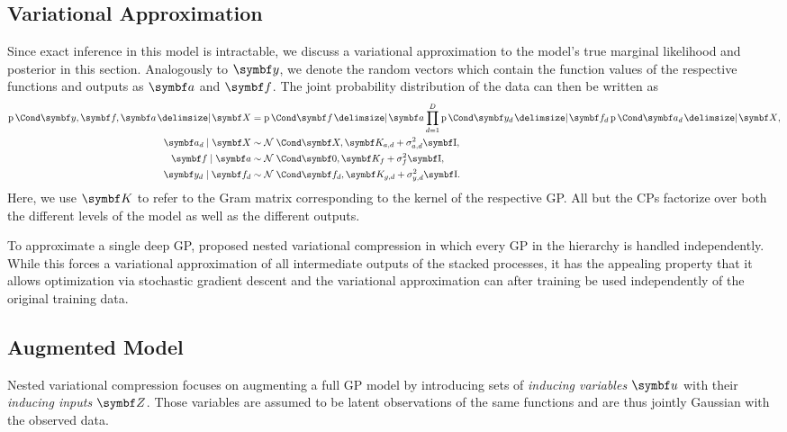 \subsection{Variational Approximation}
\label{sub:timeseries_alignment:variational_approximation}
Since exact inference in this model is intractable, we discuss a variational approximation to the model's true marginal likelihood and posterior in this section.
Analogously to $\mat{y}$, we denote the random vectors which contain the function values of the respective functions and outputs as $\rv{a}$ and $\rv{f}$.
The joint probability distribution of the data can then be written as
\begin{align}
    \begin{split}
        \label{eq:timeseries_alignment:full_model}
        \Prob{\rv{y}, \rv{f}, \rv{a} \given \mat{X}} &=
        \Prob{\rv{f} \given \rv{a}} \prod_{d=1}^D \Prob{\rv{y_d} \given \rv{f_d}}\Prob{\rv{a_d} \given \rv{X}}, \\
        \rv{a_d} \mid \mat{X} &\sim \Gaussian{\mat{X}, \mat{K_{a, d}} + \sigma^2_{a, d}\Eye}, \\
        \rv{f} \mid \mat{a} &\sim \Gaussian{\mat{0}, \mat{K_f} + \sigma^2_f\Eye}, \\
        \rv{y_d} \mid \mat{f_d} &\sim \Gaussian{\mat{f_d}, \mat{K_{g, d}} + \sigma^2_{y, d}\Eye}.
    \end{split}
\end{align}
Here, we use $\mat{K}$ to refer to the Gram matrix corresponding to the kernel of the respective GP.
All but the CPs factorize over both the different levels of the model as well as the different outputs.

To approximate a single deep GP, \Textcite{hensman_nested_2014} proposed nested variational compression in which every GP in the hierarchy is handled independently.
While this forces a variational approximation of all intermediate outputs of the stacked processes, it has the appealing property that it allows optimization via stochastic gradient descent \parencite{hensman_gaussian_2013} and the variational approximation can after training be used independently of the original training data.

\subsection{Augmented Model}
\label{sub:timeseries_alignment:augmented_model}
Nested variational compression focuses on augmenting a full GP model by introducing sets of \emph{inducing variables} $\mat{u}$ with their \emph{inducing inputs} $\mat{Z}$.
Those variables are assumed to be latent observations of the same functions and are thus jointly Gaussian with the observed data.

